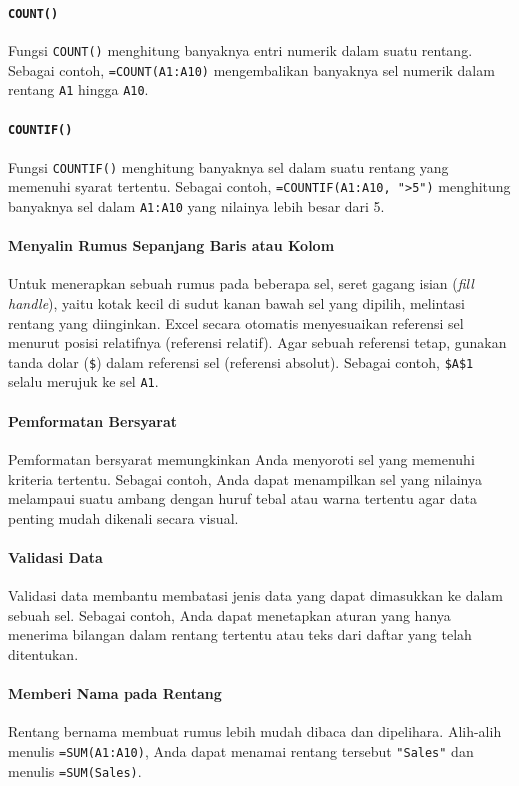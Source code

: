 \paragraph{\texttt{COUNT()}}
Fungsi \texttt{COUNT()} menghitung banyaknya entri numerik dalam suatu rentang. Sebagai contoh, \texttt{=COUNT(A1:A10)} mengembalikan banyaknya sel numerik dalam rentang \texttt{A1} hingga \texttt{A10}.

\paragraph{\texttt{COUNTIF()}}
Fungsi \texttt{COUNTIF()} menghitung banyaknya sel dalam suatu rentang yang memenuhi syarat tertentu. Sebagai contoh, \texttt{=COUNTIF(A1:A10, ">5")} menghitung banyaknya sel dalam \texttt{A1:A10} yang nilainya lebih besar dari 5.

\paragraph{Menyalin Rumus Sepanjang Baris atau Kolom}
Untuk menerapkan sebuah rumus pada beberapa sel, seret gagang isian (\emph{fill handle}), yaitu kotak kecil di sudut kanan bawah sel yang dipilih, melintasi rentang yang diinginkan. Excel secara otomatis menyesuaikan referensi sel menurut posisi relatifnya (referensi relatif). Agar sebuah referensi tetap, gunakan tanda dolar (\texttt{\$}) dalam referensi sel (referensi absolut). Sebagai contoh, \texttt{\$A\$1} selalu merujuk ke sel \texttt{A1}.

\paragraph{Pemformatan Bersyarat}
Pemformatan bersyarat memungkinkan Anda menyoroti sel yang memenuhi kriteria tertentu. Sebagai contoh, Anda dapat menampilkan sel yang nilainya melampaui suatu ambang dengan huruf tebal atau warna tertentu agar data penting mudah dikenali secara visual.

\paragraph{Validasi Data}
Validasi data membantu membatasi jenis data yang dapat dimasukkan ke dalam sebuah sel. Sebagai contoh, Anda dapat menetapkan aturan yang hanya menerima bilangan dalam rentang tertentu atau teks dari daftar yang telah ditentukan.

\paragraph{Memberi Nama pada Rentang}
Rentang bernama membuat rumus lebih mudah dibaca dan dipelihara. Alih-alih menulis \texttt{=SUM(A1:A10)}, Anda dapat menamai rentang tersebut \texttt{"Sales"} dan menulis \texttt{=SUM(Sales)}.

